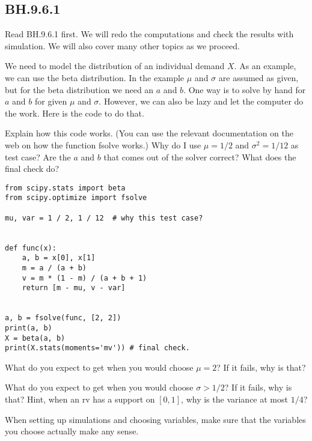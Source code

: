 
\subsection{BH.9.6.1}
\label{sec:bh.9.6.1}

Read BH.9.6.1 first. We will redo the computations and check the results with simulation. We will also cover many other topics as we proceed.



\begin{exercise}
We need to model the distribution of an individual demand $X$.
As an example, we can use the beta distribution. In the example  $\mu$ and $\sigma$ are assumed as given, but for the beta distribution we need an $a$ and $b$. One way is to solve by hand for $a$ and $b$ for given $\mu$ and $\sigma$. However, we can also be lazy and let the computer do the work. Here is the code to do that.

Explain how this code works. (You can use the relevant documentation on the web on how the function fsolve works.) Why do I use $\mu=1/2$ and $\sigma^{2}=1/12$ as test case? Are the $a$ and $b$ that comes out of the solver correct? What does the final check do?
\begin{verbatim}
from scipy.stats import beta
from scipy.optimize import fsolve

mu, var = 1 / 2, 1 / 12  # why this test case?


def func(x):
    a, b = x[0], x[1]
    m = a / (a + b)
    v = m * (1 - m) / (a + b + 1)
    return [m - mu, v - var]


a, b = fsolve(func, [2, 2])
print(a, b)
X = beta(a, b)
print(X.stats(moments='mv')) # final check.
\end{verbatim}
\end{exercise}

\begin{exercise}
What do you expect to get when you would choose $\mu=2$? If it fails, why is that?
\end{exercise}

\begin{exercise}
What do you expect to get when you would choose $\sigma > 1/2$? If it fails, why is that? Hint, when an rv has a support on $[0,1]$, why is the variance at most $1/4$?
\end{exercise}

\begin{remark}
When setting up simulations and choosing variables, make sure that the variables you choose actually make any sense.
\end{remark}

